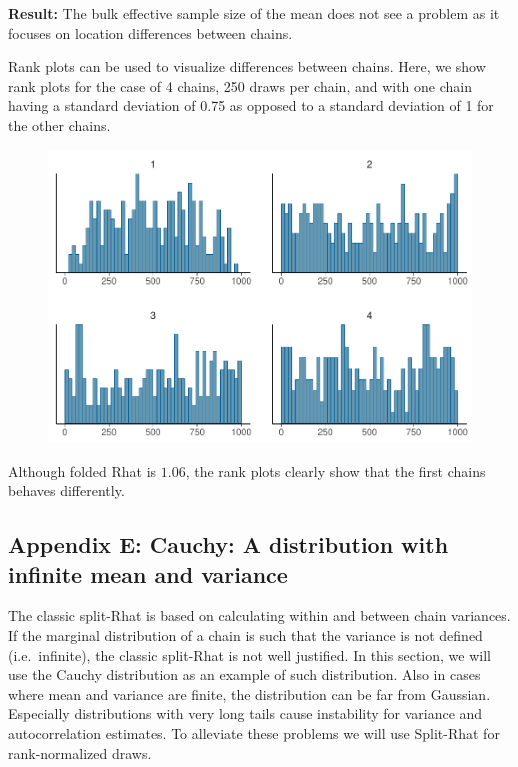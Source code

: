 \documentclass[american,]{article}
\begin{document}
\textbf{Result:} The bulk effective sample size of the mean does not see
a problem as it focuses on location differences between chains.

Rank plots can be used to visualize differences between chains. Here, we
show rank plots for the case of 4 chains, 250 draws per chain, and with
one chain having a standard deviation of 0.75 as opposed to a standard
deviation of 1 for the other chains.

\begin{figure}[tp]
  \centering
  \includegraphics[width=0.6\linewidth]{graphics/hist-scaled-chain-1.pdf}
\end{figure}

Although folded Rhat is \(1.06\), the rank plots clearly show that the
first chains behaves differently.

\hypertarget{AppendixE}{%
\subsection*{Appendix E: Cauchy: A distribution with infinite mean and
variance}\label{AppendixE}}

The classic split-Rhat is based on calculating within and between chain
variances. If the marginal distribution of a chain is such that the
variance is not defined (i.e.~infinite), the classic split-Rhat is not
well justified. In this section, we will use the Cauchy distribution as
an example of such distribution. Also in cases where mean and variance
are finite, the distribution can be far from Gaussian. Especially
distributions with very long tails cause instability for variance and
autocorrelation estimates. To alleviate these problems we will use
Split-Rhat for rank-normalized draws.

\end{document}
